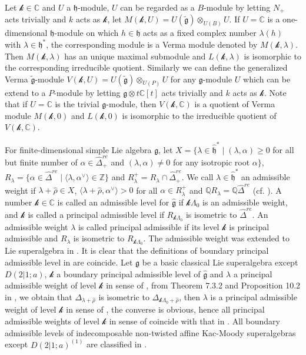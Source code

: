 \documentclass[12pt]{article}
\begin{document}
Let $\mathcal{k}\in\mathbb{C}$ and $U$ a $\mathfrak{h}$-module,
$U$ can be regarded as a $B$-module by letting $N_+$ acts trivially and $k$ acts as $\mathcal{k}$,
let $M(\mathcal{k},U)=U(\widetilde{\mathfrak{g}})\otimes_{U(B)}U$.
If $U=\mathbb{C}$ is a one-dimensional $\mathfrak{h}$-module on which $h\in\mathfrak{h}$ acts as a fixed complex number $\lambda(h)$ with $\lambda\in\mathfrak{h}^*$,
the corresponding module is a Verma module denoted by $M(\mathcal{k},\lambda)$.
Then $M(\mathcal{k},\lambda)$ has an unique maximal submodule and $L(\mathcal{k},\lambda)$ is isomorphic to the corresponding irreducible quotient.
Similarly we can define the generalized Verma $\tilde{\mathfrak{g}}$-module $V(\mathcal{k},U)=U(\tilde{\mathfrak{g}})\otimes_{U(P)}U$
for any $\mathfrak{g}$-module $U$ which can be extend to a $P$-module by letting $\mathfrak{g}\otimes t\mathbb{C}[t]$
acts trivially and $k$ acts as $\mathcal{k}$.
Note that if $U=\mathbb{C}$ is the trivial $\mathfrak{g}$-module,
then $V(\mathcal{k},\mathbb{C})$ is a quotient of Verma module $M(\mathcal{k},0)$
and $L(\mathcal{k},0)$ is isomorphic to the irreducible quotient of $V(\mathcal{k},\mathbb{C})$.


For finite-dimensional simple Lie algebra $\mathfrak{g}$,
let $X=\{\lambda\in \widehat{\mathfrak{h}}^*\mid (\lambda,\alpha)\geq 0$ for all but finite number of $\alpha\in \widehat{\Delta}_+^{re}$
and $(\lambda, \alpha)\ne 0$ for any isotropic root $\alpha\}$,
$R_\lambda=\{\alpha\in\widehat{\Delta}^{re}\mid \langle \lambda, \alpha^\vee\rangle\in\mathbb{Z}\}$
and $R_\lambda^+=R_\lambda\cap\widehat{\Delta}_+^{re}$.
We call $\lambda\in \widehat{\mathfrak{h}}^*$ an admissible weight if
$\lambda+\widehat{\rho}\in X$, $\langle \lambda+\widehat{\rho}, \alpha^\vee\rangle>0$ for all $\alpha\in R_\lambda^+$
and $\mathbb{Q}R_\lambda=\mathbb{Q}\widehat{\Delta}^{re}$ (cf. \cite{KW88}).
A number $\mathcal{k}\in\mathbb{C}$ is called an admissible level for $\widehat{\mathfrak{g}}$ if $\mathcal{k}\Lambda_0$ is an admissible weight,
and $\mathcal{k}$ is called a principal admissible level if $R_{\mathcal{k}\Lambda_0}$ is isometric to $\widehat{\Delta}^{re}$.
An admissible weight $\lambda$ is called principal admissible if its level $\mathcal{k}$ is principal admissible and $R_\lambda$
is isometric to $R_{\mathcal{k}\Lambda_0}$.
The admissible weight was extended to Lie superalgebra in \cite{KRW03,KW14,GK25}.
It is clear that the definitions of boundary principal admissible level in \cite{KRW03,KW14,GK25} are coincide.
Let $\mathfrak{g}$ be a basic classical Lie superalgebra except $D(2|1;a)$,
$\mathcal{k}$ a boundary principal admissible level of $\widehat{\mathfrak{g}}$ and
$\lambda$ a principal admissible weight of level $\mathcal{k}$ in sense of \cite{GK25},
from Theorem 7.3.2 and Proposition 10.2 in \cite{GK25},
we obtain that $\Delta_{\lambda+\widehat{\rho}}$ is isometric to $\Delta_{\mathcal{k}\Lambda_0+\widehat{\rho}}$,
 then $\lambda$ is a principal admissible weight of level $\mathcal{k}$ in sense of \cite{KRW03,KW14},
the converse is obvious, hence all principal admissible weights of level $\mathcal{k}$ in sense of \cite{GK25}
coincide with that in \cite{KRW03,KW14}.
All boundary admissible levels of indecomposable non-twisted affine Kac-Moody superalgebras except $D(2|1;a)^{(1)}$ are classified in \cite{GK25}.
\end{document}
